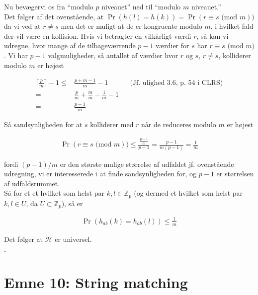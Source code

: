 \documentclass[12pt]{article}
\newcommand{\Z}{\mathbb{Z}}
\begin{document}
Nu bevægervi os fra ``modulo $p$ niveauet'' ned til ``modulo $m$ niveauet.'' \\

Det følger af det ovenstående, at $\Pr(h(l)=h(k)) = \Pr(r \equiv s \text{ (mod }m))$ da vi ved at $r \ne s$ men det er muligt at de er kongruente modulo $m$, i hvilket fald der vil være en kollision. Hvis vi betragter en vilkårligt værdi $r$, så kan vi udregne, hvor mange af de tilbageværrende $p-1$ værdier for $s$ har $r \equiv s \text{ (mod } m)$. Vi har $p-1$ valgmuligheder, så antallet af værdier hvor $r$ og $s$, $r \ne s$, kolliderer modulo $m$ er højest

\begin{align*}
    \bigg\lceil \frac{p}{m} \bigg\rceil - 1 \le& \frac{p+m-1}{m} -1 && \text{(Jf. ulighed 3.6, p. 54 i CLRS)}\\
    =& \frac{p}{m} + \frac{m}{m} - \frac{1}{m} -1 \\
    =& \frac{p-1}{m}
\end{align*}

Så sandsynligheden for at $s$ kolliderer med $r$ når de reduceres modulo $m$ er højest 

\begin{align*}
    \Pr(r \equiv s \text{ (mod } m)) \le \frac{\frac{p-1}{m}}{p-1} = \frac{p-1}{m(p-1)} =  \frac{1}{m}
\end{align*}

fordi $(p-1)/m$ er den største mulige størrelse af udfaldet jf. ovenstående udregning, vi er interesserede i at finde sandsynligheden for,  og $p-1$ er størrelsen af udfaldsrummet. \\

Så for et et hvilket som helst par $k,l \in \Z_p$ (og dermed et hvilket som helst par $k,l \in U$, da $U \subset \Z_p$), så er 

\begin{align*}
    \Pr(h_{ab}(k)=h_{ab}(l)) \le \frac{1}{m}
\end{align*}

Det følger at $\mathcal{H}$ er universel. 

\begin{flushright}
    $\square$
\end{flushright}

\newpage

\section{Emne 10: String matching}
\end{document}
